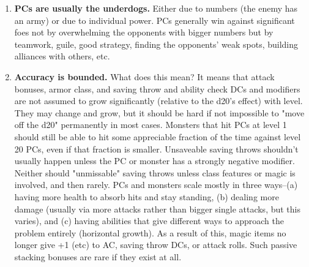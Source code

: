 \begin{enumerate}
\item \textbf{PCs are usually the underdogs.} Either due to numbers (the enemy has an army) or due to individual power. PCs generally win against significant foes not by overwhelming the opponents with bigger numbers but by teamwork, guile, good strategy, finding the opponents' weak spots, building alliances with others, etc.
\item \textbf{Accuracy is bounded.} What does this mean? It means that attack bonuses, armor class, and saving throw and ability check DCs and modifiers are not assumed to grow significantly (relative to the d20's effect) with level. They may change and grow, but it should be hard if not impossible to "move off the d20" permanently in most cases. Monsters that hit PCs at level 1 should still be able to hit some appreciable fraction of the time against level 20 PCs, even if that fraction is smaller. Unsaveable saving throws shouldn't usually happen unless the PC or monster has a strongly negative modifier. Neither should "unmissable" saving throws unless class features or magic is involved, and then rarely. PCs and monsters scale mostly in three ways--(a) having more health to absorb hits and stay standing, (b) dealing more damage (usually via more attacks rather than bigger single attacks, but this varies), and (c) having abilities that give different ways to approach the problem entirely (horizontal growth). As a result of this, magic items no longer give +1 (etc) to AC, saving throw DCs, or attack rolls. Such passive stacking bonuses are rare if they exist at all.   
\end{enumerate}

